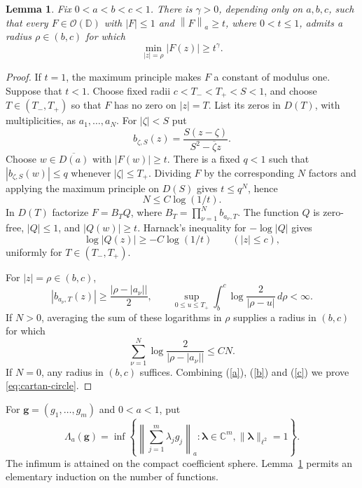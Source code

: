 \documentclass[12pt,letterpaper,reqno]{amsart}
\newtheorem{lem}[thm]{Lemma}
\theoremstyle{definition}
\numberwithin{equation}{section}
\newcommand{\D}{\mathbb D}
\newcommand{\C}{\mathbb C}
\newcommand{\OO}{\mathcal O}
\newcommand{\dd}{\,d}
\newcommand{\norm}[2]{\left\lVert #1\right\rVert_{#2}}
\begin{document}
	\begin{lem}\label{lem:cartan-circle}
		Fix $0<a<b<c<1$. There is $\gamma>0$, depending only on $a,b,c$,
		such that every $F\in\OO(\D)$ with $|F|\le1$ and
		$\norm{F}{a}\ge t$, where $0<t\le1$, admits a radius $\rho\in(b,c)$
		for which
		\begin{equation}\label{eq:cartan-circle}
			\min_{|z|=\rho}|F(z)|\ge t^\gamma.
		\end{equation}
	\end{lem}
	
	\begin{proof}
		If $t=1$, the maximum principle makes $F$ a constant of modulus one.
		Suppose that $t<1$. Choose fixed radii
		$c<T_-<T_+<S<1$, and choose $T\in(T_-,T_+)$ so that $F$ has no
		zero on $|z|=T$. List its zeros in $D(T)$, with multiplicities, as
		$a_1,\ldots,a_N$. For $|\zeta|<S$ put
		\[
		b_{\zeta,S}(z)=\frac{S(z-\zeta)}{S^2-\overline\zeta z}.
		\]
		Choose $w\in\overline{D(a)}$ with $|F(w)|\ge t$. There is a fixed
		$q<1$ such that $|b_{\zeta,S}(w)|\le q$ whenever $|\zeta|\le T_+$.
		Dividing $F$ by the corresponding $N$ factors and applying the
		maximum principle on $D(S)$ gives $t\le q^N$, hence
		\begin{equation}\label{a}
			N\le C\log(1/t).
		\end{equation}
		In $D(T)$ factorize $F=B_TQ$, where
		$B_T=\prod_{\nu=1}^N b_{a_\nu,T}$. The function $Q$ is zero-free,
		$|Q|\le1$, and $|Q(w)|\ge t$. Harnack's inequality for
		$-\log|Q|$ gives
		\begin{equation}\label{b}
			\log|Q(z)|\ge-C\log(1/t)\qquad(|z|\le c),
		\end{equation}
		uniformly for $T\in(T_-,T_+)$.
		
		For $|z|=\rho\in(b,c)$,
		\[
		|b_{a_\nu,T}(z)|\ge\frac{|\rho-|a_\nu||}{2},
		\qquad
		\sup_{0\le u\le T_+}\int_b^c\log\frac2{|\rho-u|}\dd\rho<\infty.
		\]
		If $N>0$, averaging the sum of these logarithms in $\rho$ supplies
		a radius in $(b,c)$ for which
		\begin{equation}\label{c}
			\sum_{\nu=1}^N\log\frac2{|\rho-|a_\nu||}\le CN.
		\end{equation}
		If $N=0$, any radius in $(b,c)$ suffices. Combining (\ref{a}), (\ref{b})
		and (\ref{c}) 
		we prove \eqref{eq:cartan-circle}.
	\end{proof}
	
	For $\bm{g}=(g_1,\ldots,g_m)$ and $0<a<1$, put
	\[
	\Lambda_a(\bm{g})
	=\inf\left\{\left\|\sum_{j=1}^m \lambda_jg_j\right\|_a:\bm{\lambda}\in\C^m,
	\|\bm{\lambda}\|_{\ell^2}=1\right\}.
	\]
	The infimum is attained on the compact coefficient sphere.
	Lemma~\ref{lem:cartan-circle} permits an elementary induction on
	the number of functions.
	
\end{document}
